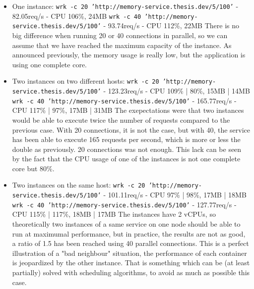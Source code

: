 \begin{itemize}
	\item{One instance: \newline
	\texttt{wrk -c 20 'http://memory-service.thesis.dev/5/100'} - 82.05req/s - CPU 106\%, 24MB \newline
	\texttt{wrk -c 40 'http://memory-service.thesis.dev/5/100'} - 93.74req/s - CPU 112\%, 22MB \newline
	There is no big difference when running 20 or 40 connections in parallel, so we can assume that we have
	reached the maximum capacity of the instance. As announced previously, the memory usage is really low, but
	the application is using one complete core.\vspace{1em}}
	\item{Two instances on two different hosts: \newline
	\texttt{wrk -c 20 'http://memory-service.thesis.dev/5/100'} - 123.23req/s - CPU 109\% | 80\%, 15MB | 14MB \newline
	\texttt{wrk -c 40 'http://memory-service.thesis.dev/5/100'} - 165.77req/s - CPU 117\% | 97\%, 17MB | 31MB \newline
	The exepectations were that two instances would be able to execute twice the number of requests compared to
	the previous case. With 20 connections, it is not the case, but with 40, the service has been able to execute
	165 requests per second, which is more or less the double as previously. 20 connections was not enough. This
	lack can be seen by the fact that the CPU usage of one of the instances is not one complete core but 80\%.}
	\item{Two instances on the same host: \newline
	\texttt{wrk -c 20 'http://memory-service.thesis.dev/5/100'} - 101.11req/s - CPU 97\% | 98\%, 17MB | 18MB \newline
	\texttt{wrk -c 40 'http://memory-service.thesis.dev/5/100'} - 127.77req/s - CPU 115\% | 117\%, 18MB | 17MB \newline
	The instances have 2 vCPUs, so theoretically two instances of a same service on one node should be able to run
	at maximumal performance, but in practice, the results are not as good, a ratio of 1.5 has been reached using
	40 parallel connections. This is a perfect illustration of a "bad neighbour" situation, the performance of
	each container is jeopardized by the other instance. That is something which can be (at least partially) solved
	with scheduling algorithms, to avoid as much as possible this case.}
\end{itemize}


